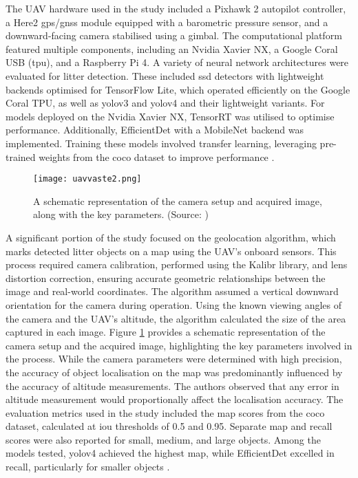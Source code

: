The UAV hardware used in the study included a Pixhawk 2 autopilot controller, a Here2 \gls{gps}/\gls{gnss} module equipped with a barometric pressure sensor, and a downward-facing camera stabilised using a gimbal. The computational platform featured multiple components, including an Nvidia Xavier NX, a Google Coral USB (\gls{tpu}), and a Raspberry Pi 4. A variety of neural network architectures were evaluated for litter detection. These included \gls{ssd} detectors with lightweight backends optimised for TensorFlow Lite, which operated efficiently on the Google Coral TPU, as well as \gls{yolo}v3 and \gls{yolo}v4 and their lightweight variants. For models deployed on the Nvidia Xavier NX, TensorRT was utilised to optimise performance. Additionally, EfficientDet with a MobileNet backend was implemented. Training these models involved transfer learning, leveraging pre-trained weights from the \gls{coco} dataset to improve performance \cite{uavvaste}.

\begin{figure}[!htbp]
    \centering
    \texttt{[image: uavvaste2.png]}
    \caption{A schematic representation of the camera setup and acquired image, along with the key parameters. (Source: \cite{uavvaste})}
    \label{fig:uavvaste2}
\end{figure}

A significant portion of the study focused on the geolocation algorithm, which marks detected litter objects on a map using the UAV’s onboard sensors. This process required camera calibration, performed using the Kalibr library, and lens distortion correction, ensuring accurate geometric relationships between the image and real-world coordinates. The algorithm assumed a vertical downward orientation for the camera during operation. Using the known viewing angles of the camera and the UAV’s altitude, the algorithm calculated the size of the area captured in each image. Figure \ref{fig:uavvaste2} provides a schematic representation of the camera setup and the acquired image, highlighting the key parameters involved in the process. While the camera parameters were determined with high precision, the accuracy of object localisation on the map was predominantly influenced by the accuracy of altitude measurements. The authors observed that any error in altitude measurement would proportionally affect the localisation accuracy.
The evaluation metrics used in the study included the \gls{map} scores from the \gls{coco} dataset, calculated at \gls{iou} thresholds of 0.5 and 0.95. Separate \gls{map} and recall scores were also reported for small, medium, and large objects. Among the models tested, \gls{yolo}v4 achieved the highest \gls{map}, while EfficientDet excelled in recall, particularly for smaller objects \cite{uavvaste}.

